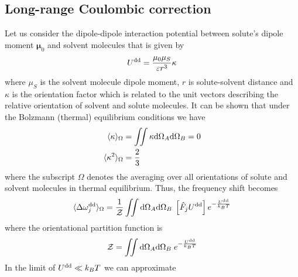 \documentclass[a4paper,titlepage,twoside,fleqn,12pt]{book}
\newcommand{\BM}[1]{\bm{#1}}
\begin{document}
\begin{refsection}

\subsection{Long\hyp{}range Coulombic correction}

Let us consider the dipole\hyp{}dipole interaction
potential between solute's dipole moment ${\BM \mu}_0$ 
and solvent molecules that is given by 
%
\begin{equation}
 U^{\rm dd} = \frac{\mu_0\mu_S}{\varepsilon r^3} \kappa
\end{equation}
%
where $\mu_S$ is the solvent molecule dipole moment, 
$r$ is solute\hyp{}solvent distance 
and $\kappa$ is the orientation factor which is related
to the unit vectors describing the relative orientation
of solvent and solute molecules. 
It can be shown that 
under the Bolzmann (thermal) equilibrium conditions we have
%
\begin{subequations}
\begin{align} \label{e:73626}
 \langle \kappa \rangle_{\Omega} &= \iint \kappa {\rm d}\Omega_A{\rm d}\Omega_B  = 0 \\
 \langle \kappa^2 \rangle_{\Omega} &= \frac{2}{3}
\end{align}
\end{subequations}
%
where the subscript
$\Omega$ denotes the averaging over all orientations of 
solute and solvent molecules in thermal equilibrium. \citep{London.TransFaradSoc.1937}
Thus, the frequency shift becomes
%
\begin{equation}
 \langle \Delta \omega_j^{\rm dd} \rangle_{\Omega} = 
\frac{1}{\mathcal{Z}} 
\iint {\rm d}\Omega_A{\rm d}\Omega_B \; \left[\hat{F}_j U^{\rm dd}\right] e^{-\frac{U^{\rm dd}}{k_BT}} 
\end{equation}
%
where the orientational 
partition function is
%
\begin{equation}
\mathcal{Z} =
\iint {\rm d}\Omega_A{\rm d}\Omega_B \; e^{-\frac{U^{\rm dd}}{k_BT}}
\end{equation}
%
In the limit of $U^{\rm dd}\ll k_BT$ we can approximate 

\end{refsection}
\end{document}

